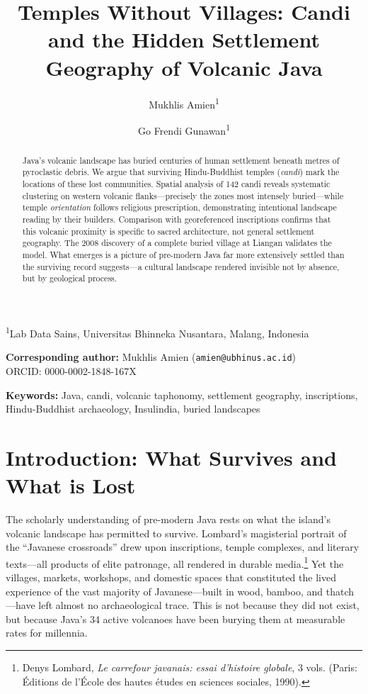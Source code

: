 \documentclass[12pt,a4paper]{article}
\title{Temples Without Villages: Candi and the Hidden Settlement Geography of Volcanic Java}
\author{Mukhlis Amien\textsuperscript{1} \and Go Frendi Gunawan\textsuperscript{1}}
\date{}
\begin{document}
\maketitle

\noindent\textsuperscript{1}Lab Data Sains, Universitas Bhinneka Nusantara, Malang, Indonesia

\vspace{0.5em}
\noindent\textbf{Corresponding author:} Mukhlis Amien (\texttt{amien@ubhinus.ac.id})\\
\noindent ORCID: 0000-0002-1848-167X

\begin{abstract}
Java's volcanic landscape has buried centuries of human settlement beneath metres of pyroclastic debris. We argue that surviving Hindu-Buddhist temples (\emph{candi}) mark the locations of these lost communities. Spatial analysis of 142 candi reveals systematic clustering on western volcanic flanks---precisely the zones most intensely buried---while temple \emph{orientation} follows religious prescription, demonstrating intentional landscape reading by their builders. Comparison with georeferenced inscriptions confirms that this volcanic proximity is specific to sacred architecture, not general settlement geography. The 2008 discovery of a complete buried village at Liangan validates the model. What emerges is a picture of pre-modern Java far more extensively settled than the surviving record suggests---a cultural landscape rendered invisible not by absence, but by geological process.
\end{abstract}

\vspace{0.5em}
\noindent\textbf{Keywords:} Java, candi, volcanic taphonomy, settlement geography, inscriptions, Hindu-Buddhist archaeology, Insulindia, buried landscapes

\newpage

\section{Introduction: What Survives and What is Lost}

The scholarly understanding of pre-modern Java rests on what the island's volcanic landscape has permitted to survive. Lombard's magisterial portrait of the ``Javanese crossroads'' drew upon inscriptions, temple complexes, and literary texts---all products of elite patronage, all rendered in durable media.\footnote{Denys Lombard, \emph{Le carrefour javanais: essai d'histoire globale}, 3 vols. (Paris: \'{E}ditions de l'\'{E}cole des hautes \'{e}tudes en sciences sociales, 1990).} Yet the villages, markets, workshops, and domestic spaces that constituted the lived experience of the vast majority of Javanese---built in wood, bamboo, and thatch---have left almost no archaeological trace. This is not because they did not exist, but because Java's 34 active volcanoes have been burying them at measurable rates for millennia.
\end{document}
